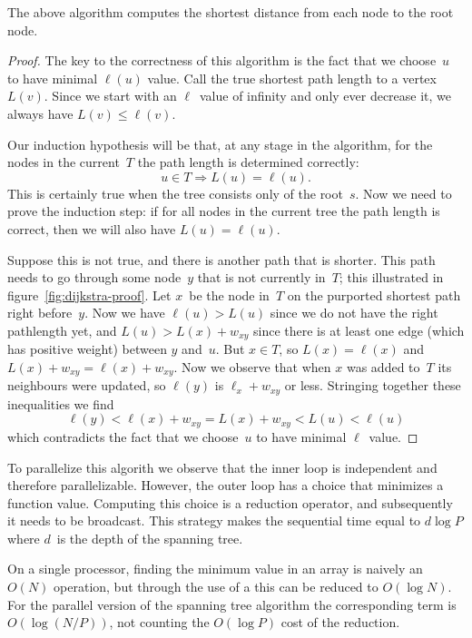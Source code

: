 \begin{theorem}
  The above algorithm computes the shortest distance from each
  node to the root node.
\end{theorem}
\begin{proof}
  The key to the correctness of this algorithm is the fact that
  we choose~$u$ to have minimal $\ell(u)$ value. Call the true shortest path
  length to a vertex~$L(v)$. Since we start with an $\ell$~value of infinity and
  only ever decrease it, we always have $L(v)\leq\ell(v)$.

  Our induction hypothesis will be that, at any stage in the algorithm,
  for the nodes in the current~$T$ the path length is determined correctly:
  \[ u\in T\Rightarrow L(u)=\ell(u). \]
  This is certainly true when the tree consists only of the root~$s$.
  Now we need to prove the induction step: if for all nodes in the
  current tree the path length is correct, then we will also 
  have $L(u)=\ell(u)$. 

  Suppose this is not true, and there is another path that is shorter.
  This path needs to go through some node~$y$ that is not currently in~$T$;
  this illustrated in figure~\ref{fig:dijkstra-proof}.
  Let $x$~be the node in~$T$ on the purported shortest path right before~$y$.
  Now we have $\ell(u)>L(u)$ since we do not have the right pathlength
  yet, and $L(u)>L(x)+w_{xy}$ since there is at least one edge (which has 
  positive weight) between $y$ and~$u$. But $x\in T$, so $L(x)=\ell(x)$
  and $L(x)+w_{xy}=\ell(x)+w_{xy}$. Now we observe that when $x$ was
  added to~$T$ its neighbours were updated, so $\ell(y)$ is $\ell_x+w_{xy}$ or less.
  Stringing together these inequalities we find 
  \[ \ell(y)<\ell(x)+w_{xy}=L(x)+w_{xy}<L(u)<\ell(u) \]
  which contradicts the fact that we choose~$u$ to have minimal $\ell$~value.
\end{proof}

To parallelize this algorith we observe that the inner loop is
independent and therefore parallelizable.
However, the outer loop
has a choice that minimizes a function value. Computing this
choice is a reduction operator, and subsequently it needs to be broadcast.
This strategy makes the sequential time equal to $d\log P$ where $d$~is
the depth of the spanning tree.

On a single processor, finding the minimum value in an array is
naively an $O(N)$ operation, but through the use of a 
this can be reduced to $O(\log N)$. For the parallel version of the spanning tree
algorithm the corresponding term is~$O(\log (N/P))$, not counting the $O(\log P)$
cost of the reduction.

